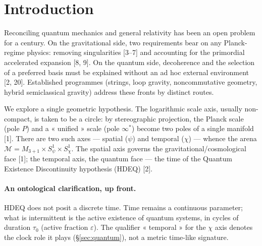 \documentclass[11pt,a4paper]{article}
\newcommand{\statut}[1]{{\footnotesize\textsf{[#1]}}}
\theoremstyle{definition}
\begin{document}
\begin{abstract}
\smallskip\noindent\textbf{Keywords:} scale duality; scalar-tensor gravity; non-minimal
coupling; natural inflation; regular black holes; intermittent quantum existence; intrinsic
decoherence; relational clock; unification.\\
\textbf{PACS:} 04.50.Kd, 04.70.Bw, 98.80.Cq, 03.65.Ta, 04.62.+v.\quad
\textbf{MSC:} 83C57, 83D05, 83F05, 81P15.

\smallskip\noindent\textit{Epistemic status:} \statut{proof} exact algebra/computer algebra
$\cdot$ \statut{numerical} reproducible integration $\cdot$ \statut{conjecture} plausible,
unproven $\cdot$ \statut{heuristic} analogy $\cdot$ \statut{speculation} open $\cdot$
\statut{open} to be established $\cdot$ \statut{to check} external ref. No conjecture is
presented as a theorem.
\end{abstract}

\section{Introduction}
Reconciling quantum mechanics and general relativity has been an open problem for a century.
On the gravitational side, two requirements bear on any Planck-regime physics: removing
singularities [3--7] and accounting for the primordial accelerated expansion [8, 9]. On the
quantum side, decoherence and the selection of a preferred basis must be explained without an
ad hoc external environment [2, 20]. Established programmes (strings, loop gravity,
noncommutative geometry, hybrid semiclassical gravity) address these fronts by distinct
routes.

We explore a single geometric hypothesis. The logarithmic scale axis, usually non-compact, is
taken to be a circle: by stereographic projection, the Planck scale (pole $P$) and a
« unified » scale (pole $\infty^*$) become two poles of a single manifold [1]. There are two
such axes --- spatial ($\psi$) and temporal ($\chi$) --- whence the arena
$\mathcal{M}=M_{3+1}\times S^1_\psi\times S^1_\chi$. The spatial axis governs the
gravitational/cosmological face [1]; the temporal axis, the quantum face --- the time of the
Quantum Existence Discontinuity hypothesis (HDEQ) [2].

\paragraph{An ontological clarification, up front.} HDEQ does not posit a discrete time.
Time remains a continuous parameter; what is intermittent is the active existence of quantum
systems, in cycles of duration $\tau_0$ (active fraction $\varepsilon$). The qualifier
« temporal » for the $\chi$ axis denotes the clock role it plays (\S\ref{sec:quantum}), not a
metric time-like signature.
\end{document}
